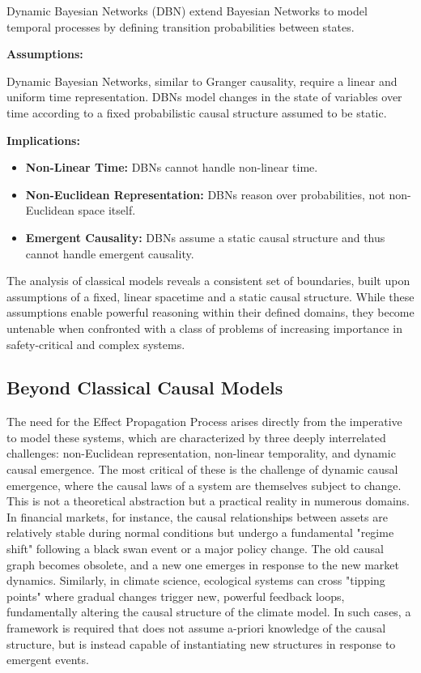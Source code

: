 Dynamic Bayesian Networks \cite{dagum1992dynamic} (DBN) extend Bayesian Networks to model temporal processes by defining transition probabilities between states.

\textbf{Assumptions:}

Dynamic Bayesian Networks, similar to Granger causality, require a linear and uniform time representation. DBNs model changes in the state of variables over time according to a fixed probabilistic causal structure assumed to be static.


\textbf{Implications:}

\begin{itemize}
    \item \textbf{Non-Linear Time:} DBNs cannot handle non-linear time.
    \item \textbf{Non-Euclidean Representation:} DBNs reason over probabilities, not non-Euclidean space itself.
    \item \textbf{Emergent Causality:}  DBNs assume a static causal structure and thus cannot handle emergent causality.
\end{itemize}

The analysis of classical models reveals a consistent set of boundaries, built upon assumptions of a fixed, linear spacetime and a static causal structure. While these assumptions enable powerful reasoning within their defined domains, they become untenable when confronted with a class of problems of increasing importance in safety-critical and complex systems. 

\subsection{Beyond Classical Causal Models}

The need for the Effect Propagation Process arises directly from the imperative to model these systems, which are characterized by three deeply interrelated challenges: non-Euclidean representation, non-linear temporality, and dynamic causal emergence. The most critical of these is the challenge of dynamic causal emergence, where the causal laws of a system are themselves subject to change. This is not a theoretical abstraction but a practical reality in numerous domains. 
In financial markets, for instance, the causal relationships between assets are relatively stable during normal conditions but undergo a fundamental "regime shift" following a black swan event or a major policy change. The old causal graph becomes obsolete, and a new one emerges in response to the new market dynamics. 
Similarly, in climate science, ecological systems can cross "tipping points" where gradual changes trigger new, 
powerful feedback loops, fundamentally altering the causal structure of the climate model. 
In such cases, a framework is required that does not assume a-priori knowledge of the causal structure, 
but is instead capable of instantiating new structures in response to emergent events.

